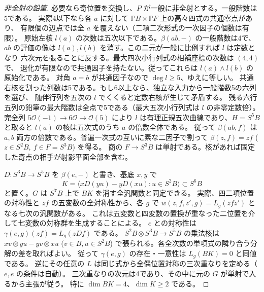 \begin{proof}[非全射の鉛筆]
必要なら奇位置を交換し、$P$ が一般に非全射とする。一般階数は5である。
実際4以下なら各 $a$ に対して $\mathbb P B\times\mathbb P F$ 上の高々四式の共通零点があり、
有限個の辺点では全 $a$ を覆えない（二項二次形式の一次因子の個数は有限）。
原始左核 $l(a)$ の次数は五次以下である。$\beta(ab,-)$ の一般階数は4で、
$ab$ の評価の像は $l(a),l(b)$ を消す。この二元が一般に比例すれば $l$ は定数となり
六次元を張ることに反する。最大四次小行列式の相補座標の次数は $(4,4)$ で、
退化が有限なので共通因子を持たない。従ってこれらは $l(a)\wedge l(b)$ の原始化である。
対角 $a=b$ が共通因子なので $\deg l\ge5$、ゆえに等しい。
共通右核を割った列数は5である。もし6以上なら、独立な入力から一般階数5の六列を選び、
随伴行列を五次の $l$ でくくると定数右核が生じて矛盾する。
残る六行五列の鉛筆の最大階数は全点で5である（最大五次小行列式は $l$ の非零定数倍）。
完全列 $5\mathcal O(-1)\to6\mathcal O\to\mathcal O(5)$ により
$l$ は有理正規五次曲線であり、$H=S^5B$ と取ると $l(a)$ の核は五次式のうち $a$ の倍数全体である。
従って $\beta(ab,f)$ は $a,b$ 両方の倍数である。普遍一次式の互いに素な二因子で割って
$\beta(z,f)=zf$ ($z\in S^2 B,\ f\in F=S^3 B$) を得る。
商の $F\to S^3 B$ は単射である。核があれば固定した奇点の相手が射影平面全部を含む。

$D:S^3 B\to S^5 B$ を $\beta(e,-)$ と書き、基底 $x,y$ で
\[
 K=\langle xD(yu)-yD(xu):u\in S^2 B\rangle\subset S^6 B
\]
と置く。$G$ は $S^7 B$ 上で $BK$ を消す全汎関数と同定できる。
実際、四二項位置の対称性と $zf$ の五変数の全対称性から、各 $g$ で
$w(z,f,z',g)=L_g(z f z')$ となる七次の汎関数がある。
これは五変数と四変数の置換が重なった二位置を介して七変数の対称群を生成することによる。
$e$ との対称性は $\gamma(e,g)(zf)=L_g(z D f)$ である。
$S^2 B\otimes S^3 B\to S^5 B$ の乗法核は $xv\otimes yu-yv\otimes xu$ ($v\in B,u\in S^2 B$)
で張られる。各全次数の単項式の隣り合う分解の差を取ればよい。
従って $\gamma(e,g)$ の存在・一意性は $L_g(BK)=0$ と同値である。
逆にその任意の $L$ は同じ式から全偶位置対称の三次重なりを定める（$e,e$ の条件は自動）。
三次重なりの次元は4であり、その中に元の $G$ が単射で入るから主張が従う。
特に $\dim BK=4$、$\dim K\ge2$ である。


\end{proof}
